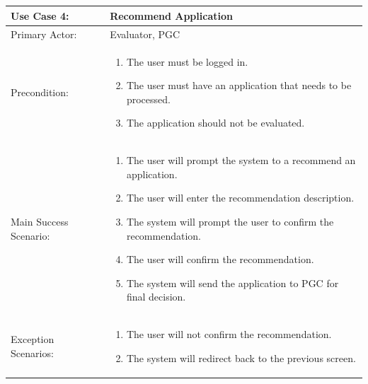\documentclass{article}
\begin{document}
\\ \\ \\ \\
\begin{tabular} {| m{5cm} | m{10cm} |}
\hline
Use Case 4: & Recommend Application \\
\hline
Primary Actor: & Evaluator, PGC \\
\hline
Precondition: & \begin{enumerate} \itemsep0em \item The user must be logged in. 
\item The user must have an application that needs to be processed.
\item The application should not be evaluated.
\end{enumerate} \\
\hline
Main Success Scenario: & \begin{enumerate} \itemsep0em \item The user will prompt the system to a recommend an application.
\item The user will enter the recommendation description.
\item The system will prompt the user to confirm the recommendation.
\item The user will confirm the recommendation.
\item The system will send the application to PGC for final decision.
\end{enumerate}\\
\hline
Exception Scenarios: & \begin{enumerate}  \itemsep0em \item The user will not confirm the recommendation.
\item The system will redirect back to the previous screen.
\end{enumerate} \\
\hline
\end{tabular}
\\ \\ \\ \\
\end{document}
